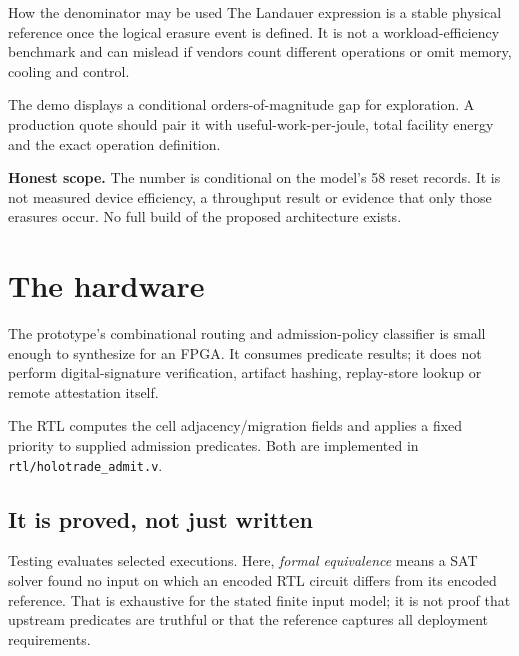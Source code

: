 \documentclass[11pt,letterpaper]{article}
\begin{document}
\begin{keybox}{How the denominator may be used}
The Landauer expression is a stable physical reference once the logical erasure
event is defined. It is not a workload-efficiency benchmark and can mislead if
vendors count different operations or omit memory, cooling and control.

\vspace{5pt}
The demo displays a conditional orders-of-magnitude gap for exploration. A
production quote should pair it with useful-work-per-joule, total facility
energy and the exact operation definition.
\end{keybox}

\begin{scopebox}
\textbf{Honest scope.} The number is conditional on the model's 58 reset
records. It is not measured device efficiency, a throughput result or evidence
that only those erasures occur. No full build of the proposed architecture
exists.
\end{scopebox}

\newpage

\section{The hardware}
\label{sec:rtl}

The prototype's combinational routing and admission-policy classifier is small
enough to synthesize for an FPGA. It consumes predicate results; it does not
perform digital-signature verification, artifact hashing, replay-store lookup
or remote attestation itself.

The RTL computes the cell adjacency/migration fields and applies a fixed
priority to supplied admission predicates. Both are implemented in
\texttt{rtl/holotrade\_admit.v}.

\subsection{It is proved, not just written}

\begin{plainbox}
Testing evaluates selected executions. Here, \emph{formal equivalence} means a
SAT solver found no input on which an encoded RTL circuit differs from its
encoded reference. That is exhaustive for the stated finite input model; it is
not proof that upstream predicates are truthful or that the reference captures
all deployment requirements.
\end{plainbox}
\end{document}
